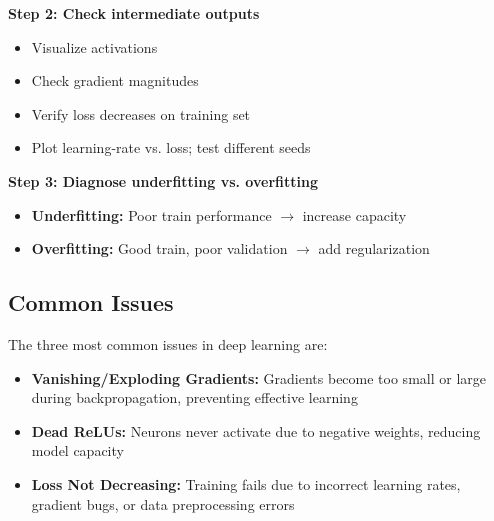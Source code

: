 \textbf{Step 2: Check intermediate outputs}
\begin{itemize}
    \item Visualize activations
    \item Check gradient magnitudes
    \item Verify loss decreases on training set
    \item Plot learning-rate vs. loss; test different seeds
\end{itemize}

\textbf{Step 3: Diagnose underfitting vs. overfitting}
\begin{itemize}
    \item \textbf{Underfitting:} Poor train performance $\to$ increase capacity
    \item \textbf{Overfitting:} Good train, poor validation $\to$ add regularization
\end{itemize}

\subsection{Common Issues}

\begin{remark}
The three most common issues in deep learning are:
\begin{itemize}
    \item \textbf{Vanishing/Exploding Gradients:} Gradients become too small or large during backpropagation, preventing effective learning
    \item \textbf{Dead ReLUs:} Neurons never activate due to negative weights, reducing model capacity
    \item \textbf{Loss Not Decreasing:} Training fails due to incorrect learning rates, gradient bugs, or data preprocessing errors
\end{itemize}
\end{remark}


